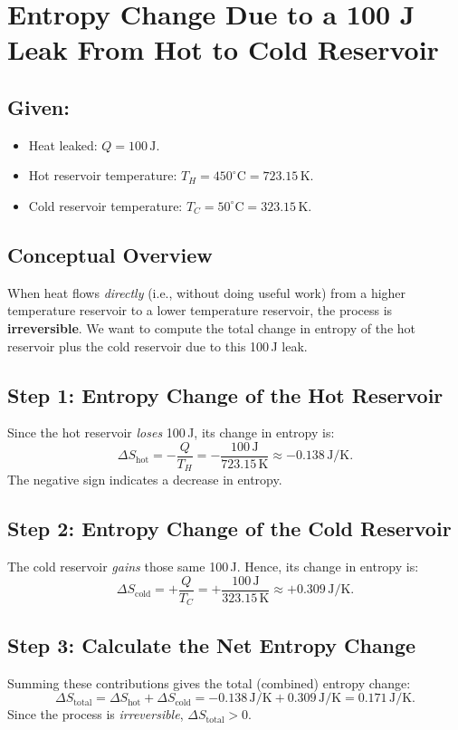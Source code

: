 \documentclass[12pt]{article}
\theoremstyle{definition} %
\theoremstyle{plain} %
\begin{document}
\section*{Entropy Change Due to a 100 J Leak From Hot to Cold Reservoir}

\subsection*{Given:}
\begin{itemize}
    \item Heat leaked: \(Q = 100\,\mathrm{J}\).
    \item Hot reservoir temperature: \(T_H = 450^\circ\mathrm{C} = 723.15\,\mathrm{K}.\)
    \item Cold reservoir temperature: \(T_C = 50^\circ\mathrm{C} = 323.15\,\mathrm{K}.\)
\end{itemize}

\subsection*{Conceptual Overview}
When heat flows \emph{directly} (i.e., without doing useful work) from a higher temperature reservoir to a lower temperature reservoir, the process is \textbf{irreversible}. We want to compute the total change in entropy of the hot reservoir plus the cold reservoir due to this 100\,J leak.

\subsection*{Step 1: Entropy Change of the Hot Reservoir}
Since the hot reservoir \textit{loses} 100\,J, its change in entropy is:
\[
\Delta S_{\text{hot}} = -\frac{Q}{T_H} 
= -\frac{100\,\mathrm{J}}{723.15\,\mathrm{K}}
\approx -0.138\,\mathrm{J/K}.
\]
The negative sign indicates a decrease in entropy.

\subsection*{Step 2: Entropy Change of the Cold Reservoir}
The cold reservoir \textit{gains} those same 100\,J. Hence, its change in entropy is:
\[
\Delta S_{\text{cold}} 
= +\frac{Q}{T_C} 
= +\frac{100\,\mathrm{J}}{323.15\,\mathrm{K}}
\approx +0.309\,\mathrm{J/K}.
\]

\subsection*{Step 3: Calculate the Net Entropy Change}
Summing these contributions gives the total (combined) entropy change:
\[
\Delta S_{\text{total}} 
= \Delta S_{\text{hot}} + \Delta S_{\text{cold}}
= -0.138\,\mathrm{J/K} + 0.309\,\mathrm{J/K}
= 0.171\,\mathrm{J/K}.
\]
Since the process is \emph{irreversible}, \(\Delta S_{\text{total}}>0\). 
\end{document}
